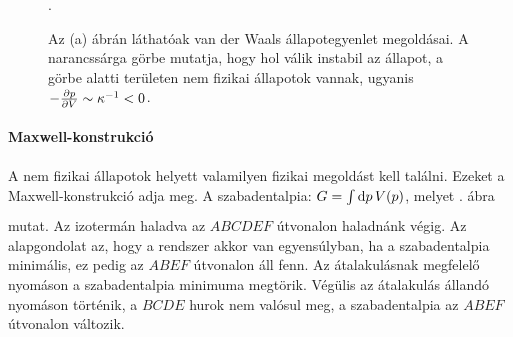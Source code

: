    \begin{figure}[ht!]
    \centering
     \hspace{6pt}
     \hspace{6pt}
    \caption{Az (a) ábrán láthatóak van der Waals állapotegyenlet megoldásai. A narancssárga görbe mutatja, hogy hol válik instabil az állapot, a görbe alatti területen nem fizikai állapotok vannak, ugyanis $-\frac{\partial p}{\partial V}\sim\kappa^{-1}<0$.}. \label{fig:B09-vdW}
   \end{figure}
   
   \paragraph{Maxwell-konstrukció}
   
    A nem fizikai állapotok helyett valamilyen fizikai megoldást kell találni. Ezeket a Maxwell-konstrukció adja meg. A szabadentalpia: $G=\int\limits_{}^{}\mathrm{d} p\, V(p)$, melyet . ábra mutat. Az izotermán haladva az $ABCDEF$ útvonalon haladnánk végig. Az alapgondolat az, hogy a rendszer akkor van egyensúlyban, ha a szabadentalpia minimális, ez pedig az $ABEF$ útvonalon áll fenn. Az átalakulásnak megfelelő nyomáson a szabadentalpia minimuma megtörik. Végülis az átalakulás állandó nyomáson történik, a $BCDE$ hurok nem valósul meg, a szabadentalpia az $ABEF$ útvonalon változik.
   
